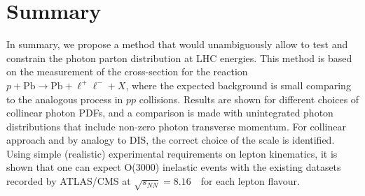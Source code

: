 \section{Summary}

In summary, we propose a method that would unambiguously allow to test and constrain the photon parton distribution at LHC energies.
This method is based on the measurement of the cross-section for the reaction $p+\textrm{Pb}\rightarrow \textrm{Pb} + \ell^+\ell^- + X$, where the expected background is small comparing to the analogous process in $pp$ collisions. 
Results are shown for different choices of collinear photon PDFs, and a comparison is made with unintegrated photon distributions that include non-zero photon transverse momentum.
For collinear approach and  by analogy to DIS, the correct choice of the scale is identified.
Using simple (realistic) experimental requirements on lepton kinematics, it is shown that one can expect O(3000) inelastic events with the existing datasets recorded by ATLAS/CMS at $\sqrt{s_{N N}} = 8.16$~\TeV\ for each lepton flavour.
